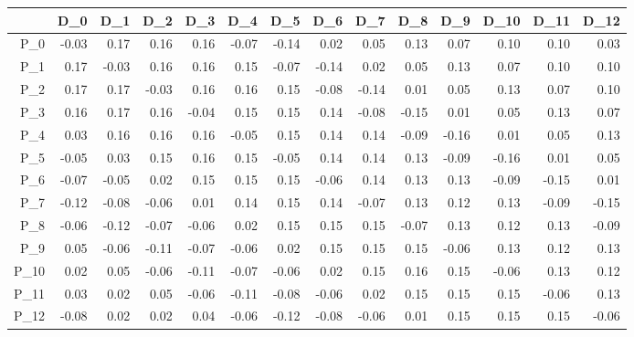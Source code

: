 \documentclass[10pt,a4paper]{article}\usepackage[]{graphicx}\usepackage[]{color}
\begin{document}
\begin{table}[ht]
\centering
\begin{tabular}{rrrrrrrrrrrrrr}
  \hline
 & D\_0 & D\_1 & D\_2 & D\_3 & D\_4 & D\_5 & D\_6 & D\_7 & D\_8 & D\_9 & D\_10 & D\_11 & D\_12 \\ 
  \hline
P\_0 & -0.03 & 0.17 & 0.16 & 0.16 & -0.07 & -0.14 & 0.02 & 0.05 & 0.13 & 0.07 & 0.10 & 0.10 & 0.03 \\ 
  P\_1 & 0.17 & -0.03 & 0.16 & 0.16 & 0.15 & -0.07 & -0.14 & 0.02 & 0.05 & 0.13 & 0.07 & 0.10 & 0.10 \\ 
  P\_2 & 0.17 & 0.17 & -0.03 & 0.16 & 0.16 & 0.15 & -0.08 & -0.14 & 0.01 & 0.05 & 0.13 & 0.07 & 0.10 \\ 
  P\_3 & 0.16 & 0.17 & 0.16 & -0.04 & 0.15 & 0.15 & 0.14 & -0.08 & -0.15 & 0.01 & 0.05 & 0.13 & 0.07 \\ 
  P\_4 & 0.03 & 0.16 & 0.16 & 0.16 & -0.05 & 0.15 & 0.14 & 0.14 & -0.09 & -0.16 & 0.01 & 0.05 & 0.13 \\ 
  P\_5 & -0.05 & 0.03 & 0.15 & 0.16 & 0.15 & -0.05 & 0.14 & 0.14 & 0.13 & -0.09 & -0.16 & 0.01 & 0.05 \\ 
  P\_6 & -0.07 & -0.05 & 0.02 & 0.15 & 0.15 & 0.15 & -0.06 & 0.14 & 0.13 & 0.13 & -0.09 & -0.15 & 0.01 \\ 
  P\_7 & -0.12 & -0.08 & -0.06 & 0.01 & 0.14 & 0.15 & 0.14 & -0.07 & 0.13 & 0.12 & 0.13 & -0.09 & -0.15 \\ 
  P\_8 & -0.06 & -0.12 & -0.07 & -0.06 & 0.02 & 0.15 & 0.15 & 0.15 & -0.07 & 0.13 & 0.12 & 0.13 & -0.09 \\ 
  P\_9 & 0.05 & -0.06 & -0.11 & -0.07 & -0.06 & 0.02 & 0.15 & 0.15 & 0.15 & -0.06 & 0.13 & 0.12 & 0.13 \\ 
  P\_10 & 0.02 & 0.05 & -0.06 & -0.11 & -0.07 & -0.06 & 0.02 & 0.15 & 0.16 & 0.15 & -0.06 & 0.13 & 0.12 \\ 
  P\_11 & 0.03 & 0.02 & 0.05 & -0.06 & -0.11 & -0.08 & -0.06 & 0.02 & 0.15 & 0.15 & 0.15 & -0.06 & 0.13 \\ 
  P\_12 & -0.08 & 0.02 & 0.02 & 0.04 & -0.06 & -0.12 & -0.08 & -0.06 & 0.01 & 0.15 & 0.15 & 0.15 & -0.06 \\ 
   \hline
\end{tabular}
\end{table}
\end{document}
